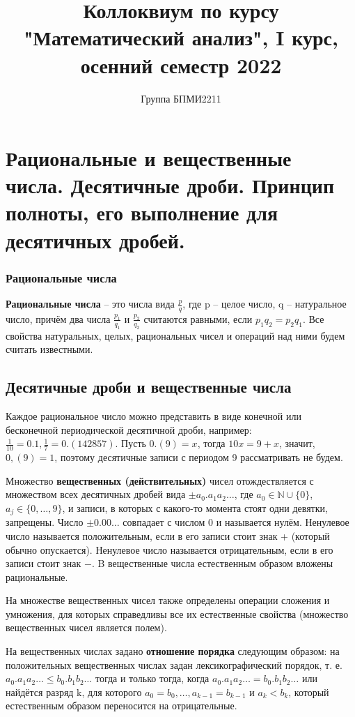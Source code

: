 \documentclass[12pt]{article}
\title{Коллоквиум по курсу "Математический анализ", I курс, осенний семестр 2022}
\author{Группа БПМИ2211}
\theoremstyle{definition}
\begin{document}
\maketitle

\section{Рациональные и вещественные числа. Десятичные дроби. Принцип полноты, его выполнение для десятичных дробей.}
\subsubsection*{Рациональные числа}
\textbf{Рациональные числа} – это числа вида $\frac{p}{q}$, где p – целое число, q – натуральное число, причём два числа $\frac{p_1}{q_1}$  и $\frac{p_2}{q_2}$  считаются равными, если $p_1q_2=p_2q_1$. Все свойства натуральных, целых, рациональных чисел и операций над ними будем считать известными.

\subsection*{Десятичные дроби и вещественные числа}

Каждое рациональное число можно представить в виде конечной или бесконечной периодической десятичной дроби, например: $\frac{1}{10}=0.1,   \frac{1}{7}=0.(142857)$. Пусть $0.(9)=x$, тогда $10x=9+x$, значит, $0,(9)=1$, поэтому десятичные записи с периодом 9 рассматривать не будем.

Множество \textbf{вещественных (действительных)} чисел отождествляется с множеством всех десятичных дробей вида $ \pm a_0.a_1 a_2\ldots$,  где $a_0 \in \mathbb {N} \cup \{0\}$, $a_j \in \{0,…,9\}$, и записи, в которых с какого-то момента стоят одни девятки, запрещены. Число $\pm 0.00\ldots$ совпадает с числом 0 и называется нулём. Ненулевое число называется положительным, если в его записи стоит знак + (который обычно опускается). Ненулевое число называется отрицательным, если в его записи стоит знак $-$. B вещественные числа естественным образом вложены рациональные.

На множестве вещественных чисел также определены операции сложения и умножения, для которых справедливы все их естественные свойства (множество вещественных чисел является полем).

На вещественных числах задано \textbf{отношение порядка} следующим образом: на положительных вещественных числах задан лексикографический порядок, т. е. $a_0.a_1a_2\ldots\leq b_0.b_1 b_2\ldots$ тогда и только тогда, когда $a_0.a_1 a_2 \ldots = b_0.b_1 b_2 \ldots $ или найдётся разряд k, для которого $a_0=b_0,\ldots,a_{k-1}=b_{k-1}$ и $a_k<b_k$, который естественным образом переносится на отрицательные.
\end{document}
